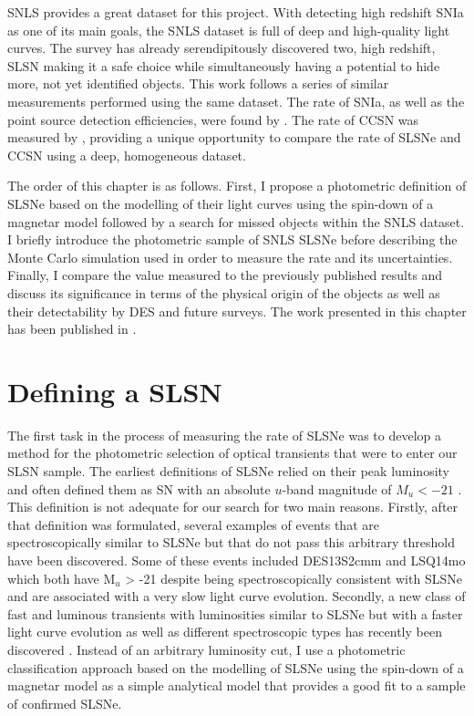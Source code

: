 SNLS provides a great dataset for this project. With detecting high redshift SNIa as one of its main goals, the SNLS dataset is full of deep and high-quality light curves. The survey has already serendipitously discovered two, high redshift, SLSN \citep{Howell2013} making it a safe choice while simultaneously having a potential to hide more, not yet identified objects. This work follows a series of similar measurements performed using the same dataset. The rate of SNIa, as well as the point source detection efficiencies, were found by \citet{Perrett2012}. The rate of CCSN was measured by \citet{Bazin2009}, providing a unique opportunity to compare the rate of SLSNe and CCSN using a deep, homogeneous dataset.

The order of this chapter is as follows. First, I propose a photometric definition of SLSNe based on the modelling of their light curves using the spin-down of a magnetar model followed by a search for missed objects within the SNLS dataset. I briefly introduce the photometric sample of SNLS SLSNe before describing the Monte Carlo simulation used in order to measure the rate and its uncertainties. Finally, I compare the value measured to the previously published results and discuss its significance in terms of the physical origin of the objects as well as their detectability by DES and future surveys. The work presented in this chapter has been published in \citet{Prajs2016}.

\section{Defining a SLSN}
\label{sec:SLSNDefinition}
The first task in the process of measuring the rate of SLSNe was to develop a method for the photometric selection of optical transients that were to enter our SLSN sample. The earliest definitions of SLSNe relied on their peak luminosity and often defined them as SN with an absolute $u$-band magnitude of $M_{u}<-21$ \citep{Gal-Yam2012}. This definition is not adequate for our search for two main reasons. Firstly, after that definition was formulated, several examples of events that are spectroscopically similar to SLSNe but that do not pass this arbitrary threshold have been discovered. Some of these events included DES13S2cmm \citep{Papadopoulos2015} and LSQ14mo \citep{Leloudas2015a} which both have M$_u$ > -21 despite being spectroscopically consistent with SLSNe and are associated with a very slow light curve evolution. Secondly, a new class of fast and luminous transients with luminosities similar to SLSNe but with a faster light curve evolution as well as different spectroscopic types has recently been discovered \citep{Arcavi2016}. Instead of an arbitrary luminosity cut, I use a photometric classification approach based on the modelling of SLSNe using the spin-down of a magnetar model as a simple analytical model that provides a good fit to a sample of confirmed SLSNe.

